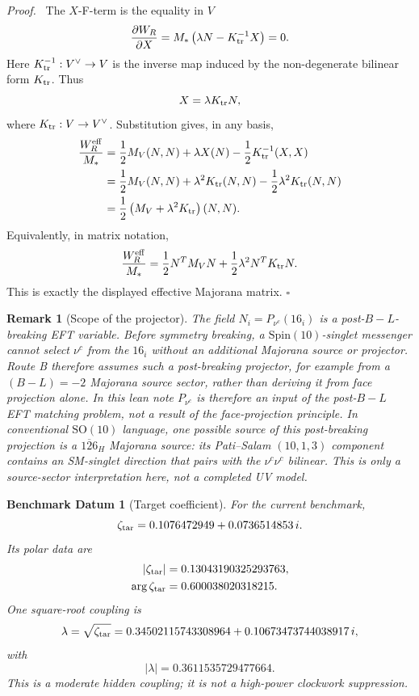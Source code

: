 \documentclass[
  aps,
  prd,
  preprint,
  nofootinbib,
  superscriptaddress,
  longbibliography
]{revtex4-2}
\newcommand{\Spin}{\mathrm{Spin}}
\newcommand{\SO}{\mathrm{SO}}
\newtheorem{datum}[theorem]{Benchmark Datum}
\newtheorem{remark}[theorem]{Remark}
\newenvironment{proof}{\par\noindent\textit{Proof.}\ }{\hfill\(\square\)\par}
\begin{document}
\begin{proof}
The \(X\)-F-term is the equality in \(V\)
\[
  \frac{\partial W_R}{\partial X}
  =
  M_*\left(\lambda N-K_{\rm tr}^{-1}X\right)=0.
\]
Here \(K_{\rm tr}^{-1}:V^\vee\to V\) is the inverse map induced by the
non-degenerate bilinear form \(K_{\rm tr}\).  Thus
\[
  X=\lambda K_{\rm tr}N,
\]
where \(K_{\rm tr}:V\to V^\vee\).  Substitution gives, in any basis,
\[
\begin{aligned}
  \frac{W_R^{\rm eff}}{M_*}
  &=
  \frac12 M_V(N,N)
  +\lambda X(N)
  -\frac12 K_{\rm tr}^{-1}(X,X)\\
  &=
  \frac12 M_V(N,N)
  +\lambda^2K_{\rm tr}(N,N)
  -\frac12\lambda^2K_{\rm tr}(N,N)\\
  &=
  \frac12\left(M_V+\lambda^2K_{\rm tr}\right)(N,N).
\end{aligned}
\]
Equivalently, in matrix notation,
\[
  \frac{W_R^{\rm eff}}{M_*}
  =
  \frac12 N^T M_V N+\frac12\lambda^2N^TK_{\rm tr}N .
\]
This is exactly the displayed effective Majorana matrix.
\end{proof}

\begin{remark}[Scope of the projector]
The field \(N_i=P_{\nu^c}(16_i)\) is a post-\(B-L\)-breaking EFT variable.
Before symmetry breaking, a \(\Spin(10)\)-singlet messenger cannot select
\(\nu^c\) from the \(16_i\) without an additional Majorana source or
projector.  Route B therefore assumes such a post-breaking projector, for
example from a \((B-L)=-2\) Majorana source sector, rather than deriving it
from face projection alone.  In this lean note \(P_{\nu^c}\) is therefore an
input of the post-\(B-L\) EFT matching problem, not a result of the
face-projection principle.  In conventional \(\SO(10)\) language, one
possible source of this post-breaking projection is a \(\overline{126}_H\)
Majorana source: its Pati--Salam \((10,1,3)\) component contains an
SM-singlet direction that pairs with the \(\nu^c\nu^c\) bilinear.  This is
only a source-sector interpretation here, not a completed UV model.
\end{remark}

\begin{datum}[Target coefficient]
For the current benchmark,
\[
  \zeta_{\rm tar}=0.1076472949+0.0736514853\,i.
\]
Its polar data are
\[
  \begin{aligned}
  |\zeta_{\rm tar}|&=0.13043190325293763,\\
  \arg\zeta_{\rm tar}&=0.600038020318215 .
  \end{aligned}
\]
One square-root coupling is
\[
  \lambda=\sqrt{\zeta_{\rm tar}}
  =
  0.34502115743308964
  +0.10673473744038917\,i,
\]
with
\[
  |\lambda|=0.3611535729477664.
\]
This is a moderate hidden coupling; it is not a high-power clockwork
suppression.
\end{datum}
\end{document}
